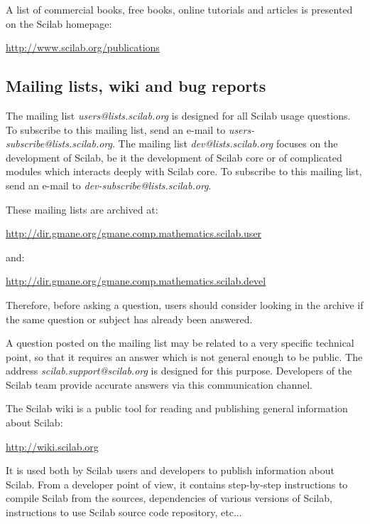 A list of commercial books, free books, online tutorials and articles 
is presented on the Scilab homepage:
\begin{center}
\url{http://www.scilab.org/publications}
\end{center}

\subsection{Mailing lists, wiki and bug reports}

The mailing list \emph{users@lists.scilab.org} is designed
for all Scilab usage questions. To subscribe to this 
mailing list, send an e-mail to \emph{users-subscribe@lists.scilab.org}.
The mailing list \emph{dev@lists.scilab.org} focuses on the development of Scilab, be 
it the development of Scilab core or of complicated modules which interacts 
deeply with Scilab core.
To subscribe to this mailing list, send an e-mail to \emph{dev-subscribe@lists.scilab.org}.

These mailing lists are archived at:
\begin{center}
\begin{small}
\url{http://dir.gmane.org/gmane.comp.mathematics.scilab.user}
\end{small}
\end{center}
and:
\begin{center}
\begin{small}
\url{http://dir.gmane.org/gmane.comp.mathematics.scilab.devel}
\end{small}
\end{center}

Therefore, before asking a question, users should consider looking in the archive 
if the same question or subject has already been answered.

A question posted on the mailing list may be related to a very specific technical point, so that it requires an
answer which is not general enough to be public. The address 
\emph{scilab.support@scilab.org} is designed for this purpose.
Developers of the Scilab team provide accurate answers via this communication
channel.

The Scilab wiki is a public tool for reading and publishing general information
about Scilab:
\begin{center}
\url{http://wiki.scilab.org}
\end{center}
It is used both by Scilab users and developers to publish 
information about Scilab. From a developer point of view, it contains step-by-step
instructions to compile Scilab from the sources, dependencies of various 
versions of Scilab, instructions to use Scilab source 
code repository, etc...

